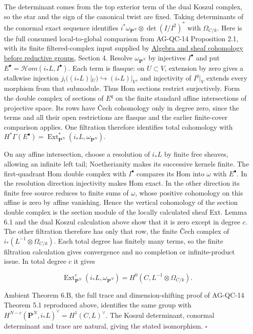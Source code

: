 \documentclass[11pt,a4paper,openany]{report}
\begin{document}
The determinant comes from the top exterior term of the dual Koszul complex, so the star and the sign of the canonical twist are fixed. Taking determinants of the conormal exact sequence identifies \(i^*\omega_{\mathbf P^N}\otimes\det(I/I^2)^*\) with \(\Omega_{C/k}\). Here is the full consumed local-to-global comparison from AG-QC-14 Proposition 2.1, with its finite filtered-complex input supplied by \href{https://github.com/KokunoYumeto/open-math-courses/blob/main/docs/courses/AG-RG/AG-RG-S01.md}{Algebra and sheaf cohomology before reductive groups}, Section 4. Resolve \(\omega_{\mathbf P^N}\) by injectives \(I^\bullet\) and put \(E^\bullet=\mathcal H om(i_*L,I^\bullet)\). Each term is flasque: on \(U\subset V\), extension by zero gives a stalkwise injection \(j_!((i_*L)|_U)\hookrightarrow(i_*L)|_V\), and injectivity of \(I^q|_V\) extends every morphism from that submodule. Thus Hom sections restrict surjectively. Form the double complex of sections of \(E^q\) on the finite standard affine intersections of projective space. Its rows have Čech cohomology only in degree zero, since the terms and all their open restrictions are flasque and the earlier finite-cover comparison applies. One filtration therefore identifies total cohomology with \(H^*\Gamma(E^\bullet)=\operatorname{Ext}^*_{\mathbf P^N}(i_*L,\omega_{\mathbf P^N})\).

On any affine intersection, choose a resolution of \(i_*L\) by finite free sheaves, allowing an infinite left tail; Noetherianity makes its successive kernels finite. The first-quadrant Hom double complex with \(I^\bullet\) compares its Hom into \(\omega\) with \(E^\bullet\). In the resolution direction injectivity makes Hom exact. In the other direction its finite free source reduces to finite sums of \(\omega\), whose positive cohomology on this affine is zero by affine vanishing. Hence the vertical cohomology of the section double complex is the section module of the locally calculated sheaf Ext. Lemma 6.1 and the dual Koszul calculation above show that it is zero except in degree \(c\). The other filtration therefore has only that row, the finite Čech complex of \(i_*(L^{-1}\otimes\Omega_{C/k})\). Each total degree has finitely many terms, so the finite filtration calculation gives convergence and no completion or infinite-product issue. In total degree \(c\) it gives

\[
\operatorname{Ext}^{c}_{\mathbf P^N}(i_*L,\omega_{\mathbf P^N})
=H^0(C,L^{-1}\otimes\Omega_{C/k}).
\]

Ambient Theorem 6.B, the full trace and dimension-shifting proof of AG-QC-14 Theorem 5.1 reproduced above, identifies the same group with \(H^{N-c}(\mathbf P^N,i_*L)^\vee=H^1(C,L)^\vee\). The Koszul determinant, conormal determinant and trace are natural, giving the stated isomorphism. \(\square\)
\end{document}
